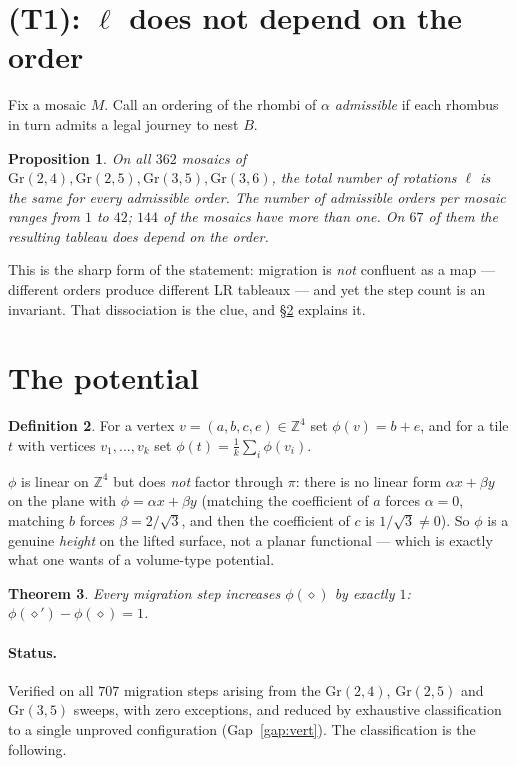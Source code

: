 \documentclass[11pt]{article}
\theoremstyle{plain}
\newtheorem{theorem}{Theorem}
\newtheorem{proposition}[theorem]{Proposition}
\theoremstyle{definition}
\newtheorem{definition}[theorem]{Definition}
\newcommand{\Z}{\mathbb{Z}}
\begin{document}
\section{(T1): $\ell$ does not depend on the order}\label{sec:t1}

Fix a mosaic $M$.  Call an ordering of the rhombi of $\alpha$ \emph{admissible} if
each rhombus in turn admits a legal journey to nest $B$.

\begin{proposition}\label{prop:t1}
On all $362$ mosaics of $\mathrm{Gr}(2,4),\mathrm{Gr}(2,5),\mathrm{Gr}(3,5),
\mathrm{Gr}(3,6)$, the total number of rotations $\ell$ is the same for every
admissible order.  The number of admissible orders per mosaic ranges from $1$ to
$42$; $144$ of the mosaics have more than one.  On $67$ of them the resulting
\emph{tableau} does depend on the order.
\end{proposition}

This is the sharp form of the statement: migration is \emph{not} confluent as a map
--- different orders produce different LR tableaux --- and yet the step count is an
invariant.  That dissociation is the clue, and \S\ref{sec:potential} explains it.

\section{The potential}\label{sec:potential}

\begin{definition}
For a vertex $v=(a,b,c,e)\in\Z^4$ set $\phi(v)=b+e$, and for a tile $t$ with
vertices $v_1,\dots,v_k$ set $\phi(t)=\tfrac1k\sum_i\phi(v_i)$.
\end{definition}

$\phi$ is linear on $\Z^4$ but does \emph{not} factor through $\pi$: there is no
linear form $\alpha x+\beta y$ on the plane with $\phi=\alpha x+\beta y$ (matching the
coefficient of $a$ forces $\alpha=0$, matching $b$ forces $\beta=2/\sqrt3$, and then
the coefficient of $c$ is $1/\sqrt3\neq0$).  So $\phi$ is a genuine \emph{height} on
the lifted surface, not a planar functional --- which is exactly what one wants of a
volume-type potential.

\begin{theorem}\label{thm:main}
Every migration step increases $\phi(\diamond)$ by exactly $1$:
$\phi(\diamond')-\phi(\diamond)=1$.
\end{theorem}

\paragraph{Status.}  Verified on all $707$ migration steps arising from the
$\mathrm{Gr}(2,4)$, $\mathrm{Gr}(2,5)$ and $\mathrm{Gr}(3,5)$ sweeps, with zero
exceptions, and reduced by exhaustive classification to a single unproved
configuration (Gap~\ref{gap:vert}).  The classification is the following.
\end{document}
